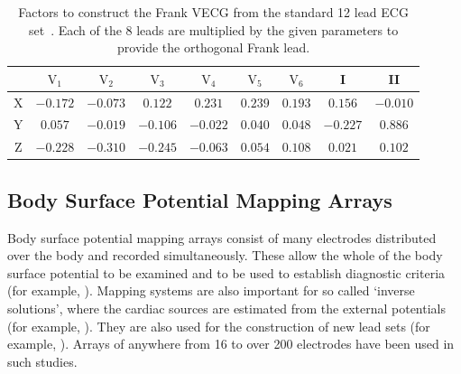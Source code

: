 \begin{table}
\caption[Inverse Dower Factors after Edenbrandt and Pahlm]{
\label{tbl:intro:ecg:inverse_dower}
Factors to construct the Frank VECG from the standard 12 lead ECG
set~\cite{Edenbrandt1988}.
Each of the 8 leads are multiplied by the given parameters to provide the
orthogonal Frank lead.
}
\begin{center}
\begin{tabular}{c c c c c c c c c}
\toprule
& $\text{V}_{\text{1}}$ &$\text{V}_{\text{2}}$ & $\text{V}_{\text{3}}$ &
$\text{V}_{\text{4}}$ & $\text{V}_{\text{5}}$ & $\text{V}_{\text{6}}$ & I & II \\
\midrule
X & $-0.172$ & $-0.073$ & $0.122$ & $0.231$ & $0.239$ & $0.193$ & $0.156$ & $-0.010$ \\
Y & $0.057$ & $-0.019$ & $-0.106$ & $-0.022$ & $0.040$ & $0.048$ & $-0.227$ & $0.886$ \\
Z & $-0.228$ & $-0.310$ & $-0.245$ & $-0.063$ & $0.054$ & $0.108$ & $0.021$ & $0.102$ \\
\bottomrule
\end{tabular}
\end{center}
\end{table}




\subsection{Body Surface Potential Mapping Arrays}

Body surface potential mapping arrays consist of many electrodes distributed
over the body and recorded simultaneously.
These allow the whole of the body surface potential to be examined and
to be used to establish diagnostic
criteria (for example, \cite{Dubuc1993,SippensGroenewegen1998}).
Mapping systems are also important for so called `inverse solutions', where the
cardiac sources are estimated from the external potentials (for example,
\cite{Ramanathan2006}).
They are also used for the construction of new lead sets (for example,
\cite{Sobieszczanska2007}).
Arrays of anywhere from 16 to over 200 electrodes have been used in such
studies.
